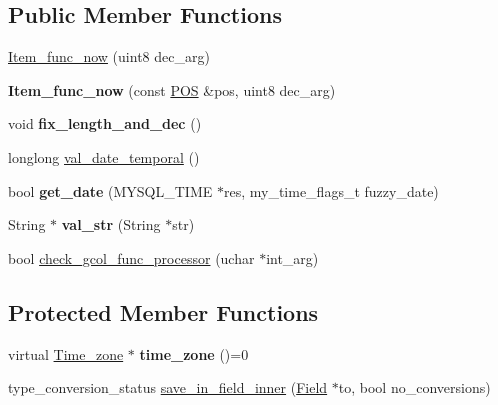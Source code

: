 \subsection*{Public Member Functions}
\begin{DoxyCompactItemize}
\item 
\mbox{\hyperlink{classItem__func__now_a3c9d2a5520c09009462186c61a20b1d2}{Item\+\_\+func\+\_\+now}} (uint8 dec\+\_\+arg)
\item 
\mbox{\label{classItem__func__now_ad10e0e1afe4ff8028154f6f6629ea7b3}} 
{\bfseries Item\+\_\+func\+\_\+now} (const \mbox{\hyperlink{structYYLTYPE}{P\+OS}} \&pos, uint8 dec\+\_\+arg)
\item 
\mbox{\label{classItem__func__now_a62820bfe57a3cdd1cae25d5cfb4e999c}} 
void {\bfseries fix\+\_\+length\+\_\+and\+\_\+dec} ()
\item 
longlong \mbox{\hyperlink{classItem__func__now_a0abcdd4d578abeacaa50a754563cbd9f}{val\+\_\+date\+\_\+temporal}} ()
\item 
\mbox{\label{classItem__func__now_a32fba6029fcb4ef72c47cff58d8981ef}} 
bool {\bfseries get\+\_\+date} (M\+Y\+S\+Q\+L\+\_\+\+T\+I\+ME $\ast$res, my\+\_\+time\+\_\+flags\+\_\+t fuzzy\+\_\+date)
\item 
\mbox{\label{classItem__func__now_a7569290022df7f7e50d35ca962f0857a}} 
String $\ast$ {\bfseries val\+\_\+str} (String $\ast$str)
\item 
bool \mbox{\hyperlink{classItem__func__now_a724c78088a5de2c85cab8d92f0f8a519}{check\+\_\+gcol\+\_\+func\+\_\+processor}} (uchar $\ast$int\+\_\+arg)
\end{DoxyCompactItemize}
\subsection*{Protected Member Functions}
\begin{DoxyCompactItemize}
\item 
\mbox{\label{classItem__func__now_a8c7e9e140ef45a3839ff0c294a3c6375}} 
virtual \mbox{\hyperlink{classTime__zone}{Time\+\_\+zone}} $\ast$ {\bfseries time\+\_\+zone} ()=0
\item 
type\+\_\+conversion\+\_\+status \mbox{\hyperlink{classItem__func__now_a8d1ad8eb628505c304c5e871c1c23dcc}{save\+\_\+in\+\_\+field\+\_\+inner}} (\mbox{\hyperlink{classField}{Field}} $\ast$to, bool no\+\_\+conversions)
\end{DoxyCompactItemize}
